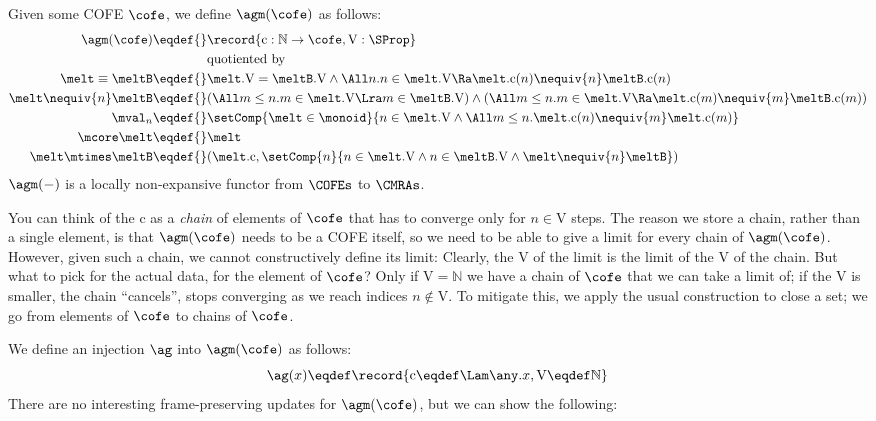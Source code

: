 Given some COFE $\cofe$, we define $\agm(\cofe)$ as follows:
\newcommand{\agc}{\mathrm{c}} %
\newcommand{\agV}{\mathrm{V}} %
\begin{align*}
  \agm(\cofe) \eqdef{}& \record{\agc : \mathbb{N} \to \cofe , \agV : \SProp} \\
  & \text{quotiented by} \\
  \melt \equiv \meltB \eqdef{}& \melt.\agV = \meltB.\agV \land \All n. n \in \melt.\agV \Ra \melt.\agc(n) \nequiv{n} \meltB.\agc(n) \\
  \melt \nequiv{n} \meltB \eqdef{}& (\All m \leq n. m \in \melt.\agV \Lra m \in \meltB.\agV) \land (\All m \leq n. m \in \melt.\agV \Ra \melt.\agc(m) \nequiv{m} \meltB.\agc(m)) \\
  \mval_n \eqdef{}& \setComp{\melt \in \monoid}{ n \in \melt.\agV \land \All m \leq n. \melt.\agc(n) \nequiv{m} \melt.\agc(m) } \\
  \mcore\melt \eqdef{}& \melt \\
  \melt \mtimes \meltB \eqdef{}& (\melt.\agc, \setComp{n}{n \in \melt.\agV \land n \in \meltB.\agV \land \melt \nequiv{n} \meltB })
\end{align*}
$\agm(-)$ is a locally non-expansive functor from $\COFEs$ to $\CMRAs$.

You can think of the $\agc$ as a \emph{chain} of elements of $\cofe$ that has to converge only for $n \in \agV$ steps.
The reason we store a chain, rather than a single element, is that $\agm(\cofe)$ needs to be a COFE itself, so we need to be able to give a limit for every chain of $\agm(\cofe)$.
However, given such a chain, we cannot constructively define its limit: Clearly, the $\agV$ of the limit is the limit of the $\agV$ of the chain.
But what to pick for the actual data, for the element of $\cofe$?
Only if $\agV = \mathbb{N}$ we have a chain of $\cofe$ that we can take a limit of; if the $\agV$ is smaller, the chain ``cancels'', \ie stops converging as we reach indices $n \notin \agV$.
To mitigate this, we apply the usual construction to close a set; we go from elements of $\cofe$ to chains of $\cofe$.

We define an injection $\ag$ into $\agm(\cofe)$ as follows:
\[ \ag(x) \eqdef \record{\mathrm c \eqdef \Lam \any. x, \mathrm V \eqdef \mathbb{N}} \]
There are no interesting frame-preserving updates for $\agm(\cofe)$, but we can show the following:
\begin{mathpar}

  
\end{mathpar}

